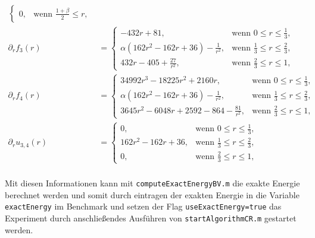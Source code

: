 \begin{align*}
\begin{cases}
    0,&\text{wenn } \frac{1+\beta}{2}\leq r,
  \end{cases}\\
  \partial_r f_3(r) &=
  \begin{cases}
    - 432r + 81, & \text{wenn } 0\leq r\leq\frac{1}{3},\\
    \alpha\left(162r^2 - 162r + 36\right) - \frac{1}{r^2}, & 
    \text{wenn } \frac{1}{3}\leq r\leq \frac{2}{3},\\
    432r - 405 + \frac{27}{r^2}, & 
    \text{wenn } \frac{2}{3}\leq r\leq 1,
  \end{cases}\\
  \partial_r f_4(r) &=
  \begin{cases}
    34992r^3 - 18225r^2 + 2160r, & \text{wenn } 0\leq r\leq\frac{1}{3},\\
    \alpha\left(162r^2 - 162r + 36\right) - \frac{1}{r^2}, & 
    \text{wenn } \frac{1}{3}\leq r\leq \frac{2}{3},\\
    3645r^2 - 6048r + 2592 - 864 - \frac{81}{r^2}, & 
    \text{wenn } \frac{2}{3}\leq r\leq 1,
  \end{cases}\\
  \partial_r u_{3,4}(r) &=
  \begin{cases}
    0, & \text{wenn } 0\leq r\leq\frac{1}{3},\\
    162r^2 - 162r + 36, & 
    \text{wenn } \frac{1}{3}\leq r\leq \frac{2}{3},\\
    0, & \text{wenn } \frac{2}{3}\leq r\leq 1,
  \end{cases}\\
\end{align*}

Mit diesen Informationen kann mit \texttt{computeExactEnergyBV.m} die exakte 
Energie berechnet werden und somit durch eintragen der exakten Energie
in die Variable \texttt{exact\-Energy} im Benchmark und setzen der Flag
\texttt{useExactEnergy=true} das Experiment durch anschließendes Ausführen
von \texttt{startAlgorithmCR.m} gestartet werden.
